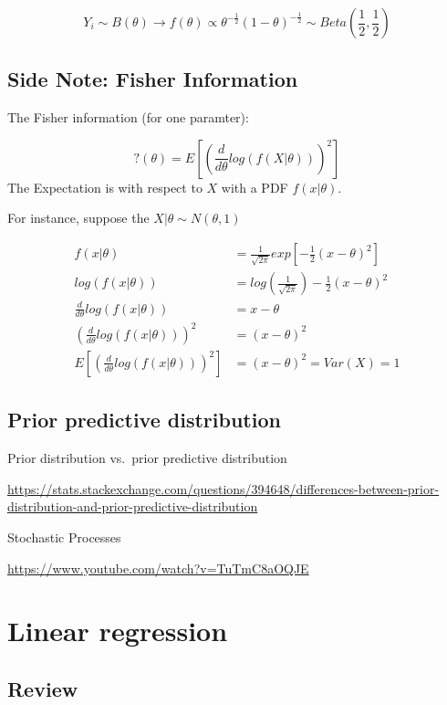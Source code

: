 \documentclass[]{book}
\begin{document}
\[Y_i \sim B(\theta) \rightarrow f(\theta) \propto \theta ^{-\frac{1}{2}}(1-\theta)^{-\frac{1}{2}}\sim Beta(\frac{1}{2},\frac{1}{2})\]

\hypertarget{side-note-fisher-information}{%
\subsection{Side Note: Fisher Information}\label{side-note-fisher-information}}

The Fisher information (for one paramter):

\[?(\theta)=E[(\frac{d}{d\theta} log(f(X|\theta)))^2]\]
The Expectation is with respect to \(X\) with a PDF \(f(x|\theta)\).

For instance, suppose the \(X|\theta \sim N(\theta,1)\)

\[\begin{aligned} f(x|\theta) &=\frac{1}{\sqrt{2 \pi}} exp[-\frac{1}{2}(x-\theta)^2] \\ log(f(x|\theta)) &= log(\frac{1}{\sqrt{2 \pi}})-\frac{1}{2}(x-\theta)^2 \\ \frac{d}{d\theta}log(f(x|\theta)) &=x-\theta \\ (\frac{d}{d\theta}log(f(x|\theta)))^2 &=(x-\theta)^2 \\E[(\frac{d}{d\theta}log(f(x|\theta)))^2]&=(x-\theta)^2=Var(X)=1 \end{aligned}\]

\hypertarget{prior-predictive-distribution}{%
\subsection{Prior predictive distribution}\label{prior-predictive-distribution}}

Prior distribution vs.~prior predictive distribution

\url{https://stats.stackexchange.com/questions/394648/differences-between-prior-distribution-and-prior-predictive-distribution}

Stochastic Processes

\url{https://www.youtube.com/watch?v=TuTmC8aOQJE}

\hypertarget{linear-regression}{%
\section{Linear regression}\label{linear-regression}}

\hypertarget{review}{%
\subsection{Review}\label{review}}
\end{document}
